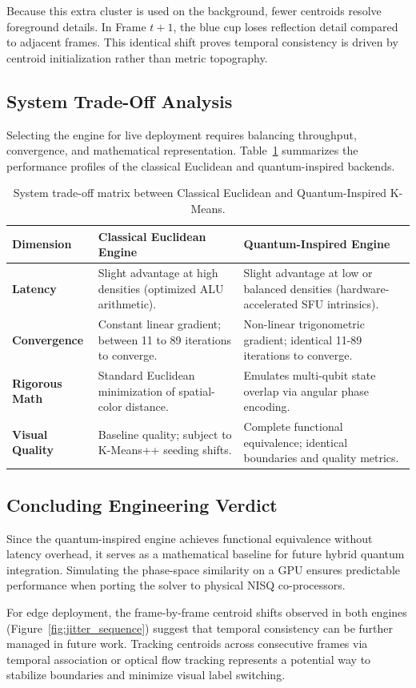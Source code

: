 Because this extra cluster is used on the background, fewer centroids resolve foreground details. In Frame $t+1$, the blue cup loses reflection detail compared to adjacent frames. This identical shift proves temporal consistency is driven by centroid initialization rather than metric topography.

\subsection{System Trade-Off Analysis}
Selecting the engine for live deployment requires balancing throughput, convergence, and mathematical representation. Table~\ref{tab:tradeoff_matrix} summarizes the performance profiles of the classical Euclidean and quantum-inspired backends.

\begin{table}[H]
\centering
\caption[System Trade-Off Matrix: Classical Euclidean vs. Quantum-Inspired]{System trade-off matrix between Classical Euclidean and Quantum-Inspired K-Means.}
\label{tab:tradeoff_matrix}
\begin{tabular}{p{2.5cm}p{5.5cm}p{6.0cm}}
\hline
\textbf{Dimension} & \textbf{Classical Euclidean Engine} & \textbf{Quantum-Inspired Engine} \\ \hline
\textbf{Latency} & Slight advantage at high densities (optimized ALU arithmetic). & Slight advantage at low or balanced densities (hardware-accelerated SFU intrinsics). \\ \hline
\textbf{Convergence} & Constant linear gradient; between 11 to 89 iterations to converge. & Non-linear trigonometric gradient; identical 11-89 iterations to converge. \\ \hline
\textbf{Rigorous Math} & Standard Euclidean minimization of spatial-color distance. & Emulates multi-qubit state overlap via angular phase encoding. \\ \hline
\textbf{Visual Quality} & Baseline quality; subject to K-Means++ seeding shifts. & Complete functional equivalence; identical boundaries and quality metrics. \\ \hline
\end{tabular}
\end{table}

\subsection{Concluding Engineering Verdict}
Since the quantum-inspired engine achieves functional equivalence without latency overhead, it serves as a mathematical baseline for future hybrid quantum integration. Simulating the phase-space similarity on a GPU ensures predictable performance when porting the solver to physical NISQ co-processors.

For edge deployment, the frame-by-frame centroid shifts observed in both engines (Figure~\ref{fig:jitter_sequence}) suggest that temporal consistency can be further managed in future work. Tracking centroids across consecutive frames via temporal association or optical flow tracking represents a potential way to stabilize boundaries and minimize visual label switching.
